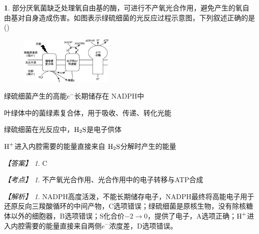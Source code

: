 \documentclass[UTF8, 10pt, a4paper, oneside]{ctexart}
\theoremstyle{definition}
\newtheorem{exercise}{}
\theoremstyle{remark}
\newtheorem*{answer}{【答案】}
\newtheorem*{point}{【考点】}      %
\newtheorem*{explanation}{【解析】}     %
\theoremstyle{plain}
\begin{document}
\begin{exercise}
    部分厌氧菌缺乏处理氧自由基的酶，可进行不产氧光合作用，避免产生的氧自由基对自身造成伤害。如图表示绿硫细菌的光反应过程示意图，下列叙述正确的是\quad(\quad)
    \begin{figure}[h!]
        \centering
        \includegraphics[width=0.4\textwidth]{assists/14-2.jpg}
    \end{figure}
    \begin{adjustwidth}{2em}{}
        \begin{asparaenum}[A. ]
            \item 绿硫细菌产生的高能$e^-$长期储存在 NADPH中
            \item 叶绿体中的菌绿素复合体，用于吸收、传递、转化光能
            \item 绿硫细菌在光反应中，$\ce{H2S}$是电子供体
            \item $\ce{H+}$进入内腔需要的能量直接来自 $\ce{H2S}$分解时产生的能量
        \end{asparaenum}
    \end{adjustwidth}
    \begin{answer}
        C
    \end{answer}
    \begin{point}
        不产氧光合作用、光合作用中的电子转移与ATP合成
    \end{point}
    \begin{explanation}
        NADPH高度活泼，不能长期储存电子，NADPH最终将高能电子用于还原反向三羧酸循环的中间产物，C选项错误；绿硫细菌是原核生物，没有除核糖体以外的细胞器，B选项错误；S化合价$-2 \rightarrow 0$，提供了电子，A选项正确；$\ce{H+}$进入内腔需要的能量直接来自两侧$e^-$浓度差，D选项错误。
    \end{explanation}
\end{exercise}
\end{document}
